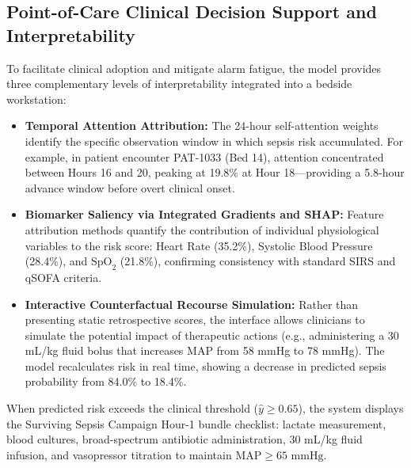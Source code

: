 \documentclass[11pt,a4paper]{article}
\begin{document}
\subsection{Point-of-Care Clinical Decision Support and Interpretability}
To facilitate clinical adoption and mitigate alarm fatigue, the model provides three complementary levels of interpretability integrated into a bedside workstation:
\begin{itemize}[leftmargin=*]
    \item \textbf{Temporal Attention Attribution:} The 24-hour self-attention weights identify the specific observation window in which sepsis risk accumulated. For example, in patient encounter PAT-1033 (Bed 14), attention concentrated between Hours 16 and 20, peaking at 19.8\% at Hour 18---providing a 5.8-hour advance window before overt clinical onset.
    \item \textbf{Biomarker Saliency via Integrated Gradients and SHAP:} Feature attribution methods quantify the contribution of individual physiological variables to the risk score: Heart Rate (35.2\%), Systolic Blood Pressure (28.4\%), and $\text{SpO}_2$ (21.8\%), confirming consistency with standard SIRS and qSOFA criteria.
    \item \textbf{Interactive Counterfactual Recourse Simulation:} Rather than presenting static retrospective scores, the interface allows clinicians to simulate the potential impact of therapeutic actions (e.g., administering a 30 mL/kg fluid bolus that increases MAP from 58 mmHg to 78 mmHg). The model recalculates risk in real time, showing a decrease in predicted sepsis probability from 84.0\% to 18.4\%.
\end{itemize}

When predicted risk exceeds the clinical threshold ($\hat{y} \ge 0.65$), the system displays the Surviving Sepsis Campaign Hour-1 bundle checklist: lactate measurement, blood cultures, broad-spectrum antibiotic administration, 30 mL/kg fluid infusion, and vasopressor titration to maintain $\text{MAP} \ge 65\text{ mmHg}$.
\end{document}

